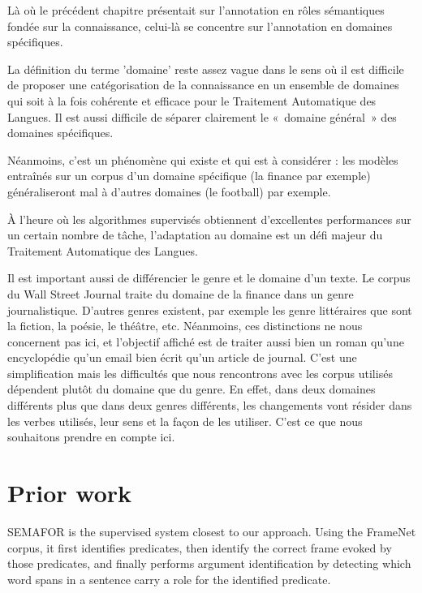 Là où le précédent chapitre présentait sur l'annotation en rôles sémantiques
fondée sur la connaissance, celui-là se concentre sur l'annotation en domaines
spécifiques.

La définition du terme 'domaine' reste assez vague dans le sens où il est
difficile de proposer une catégorisation de la connaissance en un ensemble de
domaines qui soit à la fois cohérente et efficace pour le Traitement Automatique
des Langues. Il est aussi difficile de séparer clairement le «~domaine
général~» des domaines spécifiques.


Néanmoins, c'est un phénomène qui existe et qui est à considérer : les modèles
entraînés sur un corpus d'un domaine spécifique (la finance par exemple)
généraliseront mal à d'autres domaines (le football) par exemple. %

À l'heure où les algorithmes supervisés obtiennent d'excellentes performances
sur un certain nombre de tâche, l'adaptation au domaine est un défi majeur du
Traitement Automatique des Langues.

Il est important aussi de différencier le genre et le domaine d'un texte. Le
corpus du Wall Street Journal traite du domaine de la finance dans un genre
journalistique. D'autres genres existent, par exemple les genre littéraires que
sont la fiction, la poésie, le théâtre, etc. Néanmoins, ces distinctions ne
nous concernent pas ici, et l'objectif affiché est de traiter aussi bien un
roman qu'une encyclopédie qu'un email bien écrit qu'un article de journal.
C'est une simplification mais les difficultés que nous rencontrons avec les
corpus utilisés dépendent plutôt du domaine que du genre. En effet, dans deux
domaines différents plus que dans deux genres différents, les changements vont
résider dans les verbes utilisés, leur sens et la façon de les utiliser. C'est
ce que nous souhaitons prendre en compte ici.


\section{Prior work}

SEMAFOR \citep{das2014frame} is the supervised system closest to our approach.
Using the FrameNet corpus, it first identifies predicates, then identify the
correct frame evoked by those predicates, and finally performs argument
identification by detecting which word spans in a sentence carry a role for the
identified predicate.

